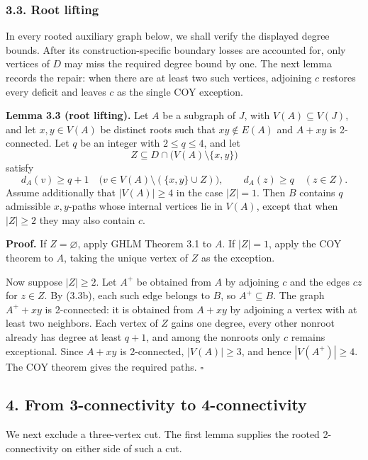 \documentclass[
  11pt]{article}
\let\papersection\subsection
\renewcommand{\subsection}{\Needspace{10\baselineskip}\papersection}
\let\papersubsection\subsubsection
\renewcommand{\subsubsection}{\Needspace{7\baselineskip}\papersubsection}
\begin{document}
\subsubsection{3.3. Root lifting}\label{root-lifting}

In every rooted auxiliary graph below, we shall verify the displayed
degree bounds. After its construction-specific boundary losses are
accounted for, only vertices of \(D\) may miss the required degree bound
by one. The next lemma records the repair: when there are at least two
such vertices, adjoining \(c\) restores every deficit and leaves \(c\)
as the single COY exception.

\textbf{Lemma 3.3 (root lifting).} Let \(A\) be a subgraph of \(J\),
with \(V(A)\subseteq V(J)\), and let \(x,y\in V(A)\) be distinct roots
such that \(xy\notin E(A)\) and \(A+xy\) is 2-connected. Let \(q\) be an
integer with \(2\le q\le4\), and let \[
 Z\subseteq D\cap\bigl(V(A)\setminus\{x,y\}\bigr)
\] satisfy \[
 d_A(v)\ge q+1
 \quad\bigl(v\in V(A)\setminus(\{x,y\}\cup Z)\bigr),
 \qquad
 d_A(z)\ge q\quad(z\in Z). \tag{3.4}
\] Assume additionally that \(|V(A)|\ge4\) in the case \(|Z|=1\). Then
\(B\) contains \(q\) admissible \(x,y\)-paths whose internal vertices
lie in \(V(A)\), except that when \(|Z|\ge2\) they may also contain
\(c\).

\textbf{Proof.} If \(Z=\varnothing\), apply GHLM Theorem 3.1 to \(A\).
If \(|Z|=1\), apply the COY theorem to \(A\), taking the unique vertex
of \(Z\) as the exception.


Now suppose \(|Z|\ge2\). Let \(A^+\) be obtained from \(A\) by adjoining
\(c\) and the edges \(cz\) for \(z\in Z\). By (3.3b), each such edge
belongs to \(B\), so \(A^+\subseteq B\). The graph \(A^++xy\) is
2-connected: it is obtained from \(A+xy\) by adjoining a vertex with at
least two neighbors. Each vertex of \(Z\) gains one degree, every other
nonroot already has degree at least \(q+1\), and among the nonroots only
\(c\) remains exceptional. Since \(A+xy\) is 2-connected,
\(|V(A)|\ge3\), and hence \(|V(A^+)|\ge4\). The COY theorem gives the
required paths. \(\square\)

\subsection{4. From 3-connectivity to
4-connectivity}\label{from-3-connectivity-to-4-connectivity}

We next exclude a three-vertex cut. The first lemma supplies the rooted
2-connectivity on either side of such a cut.
\end{document}
